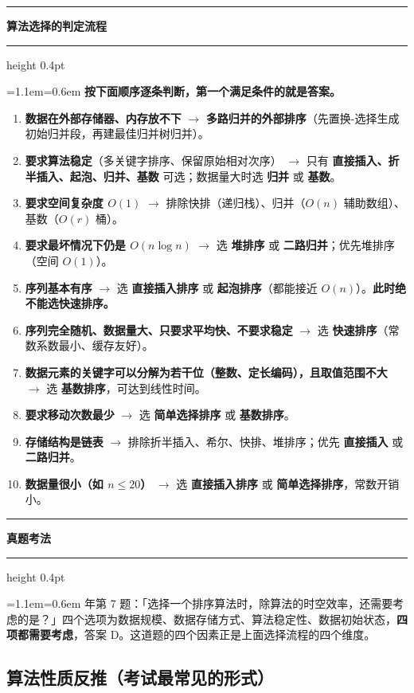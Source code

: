 \documentclass[11pt,openany,UTF8]{ctexbook}
\newcommand{\callouthead}[2]{%
  \par\addvspace{7pt}\noindent
  {\color{#1}\rule[-0.15em]{3pt}{1.05em}}\hspace{0.5em}%
  {\bfseries\color{#1}#2}\par\nobreak\vspace{-0.35em}%
  {\color{rulesep}\hrule height 0.4pt}\nobreak\vspace{0.45em}%
  \begingroup\small\setlength{\parindent}{0pt}%
  \leftskip=1.1em\rightskip=0.6em\noindent\ignorespaces}
\newcommand{\calloutend}{\par\endgroup\addvspace{7pt}}
\newenvironment{callkey}[1]{\callouthead{keybar}{#1}}{\calloutend}
\newenvironment{callexam}[1]{\callouthead{exambar}{#1}}{\calloutend}
\begin{document}
\begin{callkey}{算法选择的判定流程}
\textbf{按下面顺序逐条判断，第一个满足条件的就是答案。}

\begin{enumerate}
\item \textbf{数据在外部存储器、内存放不下} $\to$ \textbf{多路归并的外部排序}（先置换-选择生成初始归并段，再建最佳归并树归并）。
\item \textbf{要求算法稳定}（多关键字排序、保留原始相对次序） $\to$ 只有 \textbf{直接插入、折半插入、起泡、归并、基数} 可选；数据量大时选 \textbf{归并} 或 \textbf{基数}。
\item \textbf{要求空间复杂度 $O(1)$} $\to$ 排除快排（递归栈）、归并（$O(n)$ 辅助数组）、基数（$O(r)$ 桶）。
\item \textbf{要求最坏情况下仍是 $O(n\log n)$} $\to$ 选 \textbf{堆排序} 或 \textbf{二路归并}；优先堆排序（空间 $O(1)$）。
\item \textbf{序列基本有序} $\to$ 选 \textbf{直接插入排序} 或 \textbf{起泡排序}（都能接近 $O(n)$）。\textbf{此时绝不能选快速排序。}
\item \textbf{序列完全随机、数据量大、只要求平均快、不要求稳定} $\to$ 选 \textbf{快速排序}（常数系数最小、缓存友好）。
\item \textbf{数据元素的关键字可以分解为若干位（整数、定长编码），且取值范围不大} $\to$ 选 \textbf{基数排序}，可达到线性时间。
\item \textbf{要求移动次数最少} $\to$ 选 \textbf{简单选择排序} 或 \textbf{基数排序}。
\item \textbf{存储结构是链表} $\to$ 排除折半插入、希尔、快排、堆排序；优先 \textbf{直接插入} 或 \textbf{二路归并}。
\item \textbf{数据量很小（如 $n\le 20$）} $\to$ 选 \textbf{直接插入排序} 或 \textbf{简单选择排序}，常数开销小。
\end{enumerate}
\end{callkey}

\begin{callexam}{真题考法}
2019 年第 7 题：「选择一个排序算法时，除算法的时空效率，还需要考虑的是？」四个选项为数据规模、数据存储方式、算法稳定性、数据初始状态，\textbf{四项都需要考虑}，答案 D。这道题的四个因素正是上面选择流程的四个维度。

\end{callexam}

\subsection{算法性质反推（考试最常见的形式）}
\end{document}
